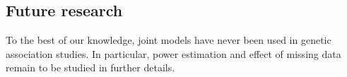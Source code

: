 \documentclass[a0,portrait]{a0poster}
\begin{document}
\begin{multicols}{2}
\section*{Future research}
\vspace{-1cm}
\par{To the best of our knowledge, joint models have never been used in genetic association studies.
In particular, power estimation and effect of missing data remain to be studied in further details.}


\end{multicols}
\color{SaddleBrown}
\normalsize
\end{document}
